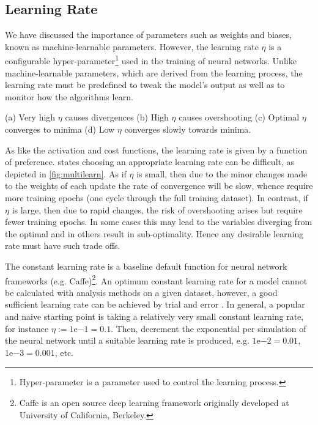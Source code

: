 \subsection{Learning Rate}\label{sec:learningrate}
We have discussed the importance of parameters such as weights and biases, known as machine-learnable parameters. However, the learning rate $\eta$ is a configurable hyper-parameter\footnote{Hyper-parameter is a parameter used to control the learning process. } used in the training of neural networks. Unlike machine-learnable parameters, which are derived from the learning process, the learning rate must be predefined to tweak the model's output as well as to monitor how the algorithms learn.

\begin{figh}
        
        \caption{(a) Very high $\eta$ causes divergences (b) High $\eta$ causes overshooting (c) Optimal $\eta$ converges to minima (d)  Low $\eta$ converges slowly towards minima.}
        \label{fig:multilearn}
\end{figh}
    
As like the activation and cost functions, the learning rate is given by a function of preference.  \textcite{wu2019demystifying} states choosing an appropriate learning rate can be difficult, as depicted in \autoref{fig:multilearn}.
As if $\eta$ is small, then due to the minor changes made to the weights of each update the rate of convergence will be slow, whence require more training epochs (one cycle through the full training dataset). In contrast, if $\eta$ is large, then due to rapid changes, the risk of overshooting arises but require fewer training epochs. In some cases this may lead to the variables diverging from the optimal and in others result in sub-optimality. Hence any desirable learning rate must have such trade offs.
    
The constant learning rate is a baseline default function for neural network frameworks (e.g.  Caffe)\footnote{Caffe is an open source deep learning framework originally developed at University of California, Berkeley.}. An optimum constant learning rate for a model cannot be calculated with analysis methods on a given dataset, however, a good sufficient learning rate can be achieved by trial and error \parencite{wu2019demystifying}.  In general, a popular and naive starting point is taking a relatively very small constant learning rate, for instance $\eta := 1\mathrm{e}{-1} = 0.1$. Then, decrement the exponential per simulation of the neural network until a suitable learning rate is produced, e.g. $1\mathrm{e}{-2}= 0.01$, $1\mathrm{e}{-3}= 0.001$, etc. 

